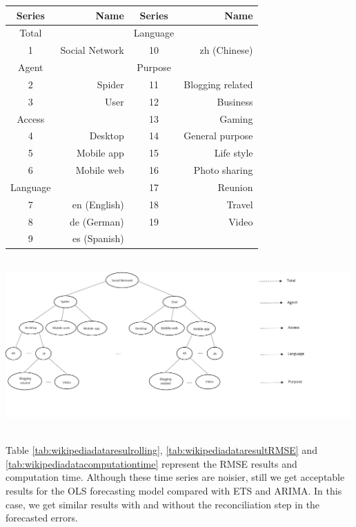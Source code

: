 \documentclass[11pt,a4paper,]{article}
\let\origfigure\figure
\let\endorigfigure\endfigure
\renewenvironment{figure}[1][2] {
    \expandafter\origfigure\expandafter[htbp]
} {
    \endorigfigure
}
\let\origtable\table
\let\endorigtable\endtable
\renewenvironment{table}[1][2] {
    \expandafter\origtable\expandafter[htbp]
} {
    \endorigtable
}
\begin{document}
\begin{table}[t]

\caption{\label{tab:wikipediagroupingstructure}Social networking Wikipedia article grouping structure}
\centering
\begin{tabular}{crcr}
\toprule
Series & Name & Series & Name\\
\midrule
Total &  & Language & \\
1 & Social Network & 10 & zh (Chinese)\\
Agent &  & Purpose & \\
2 & Spider & 11 & Blogging related\\
3 & User & 12 & Business\\
Access &  & 13 & Gaming\\
4 & Desktop & 14 & General purpose\\
5 & Mobile app & 15 & Life style\\
6 & Mobile web & 16 & Photo sharing\\
Language &  & 17 & Reunion\\
7 & en (English) & 18 & Travel\\
8 & de (German) & 19 & Video\\
9 & es (Spanish) &  & \\
\bottomrule
\end{tabular}
\end{table}

\begin{figure}

{\centering \includegraphics[width=500px,height=250px]{Paper-Figures/Wiki_group_structure} 

}

\caption{One of the possible hierarchy structures for Wikipedia pageview dataset}\label{fig:wikigroupstructure}
\end{figure}

Table \ref{tab:wikipediadataresulrolling}, \ref{tab:wikipediadataresultRMSE} and \ref{tab:wikipediadatacomputationtime} represent the RMSE results and computation time. Although these time series are noisier, still we get acceptable results for the OLS forecasting model compared with ETS and ARIMA. In this case, we get similar results with and without the reconciliation step in the forecasted errors.
\end{document}
